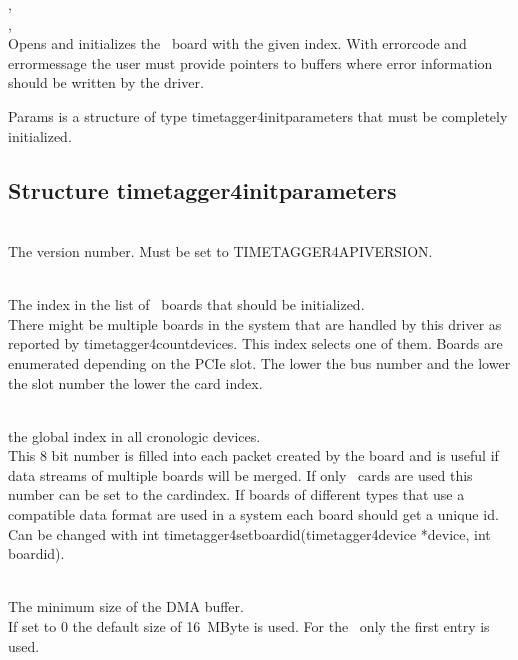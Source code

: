 		, \\ , \\
		Opens and initializes the \deviceName\ board with the given index. 
		With \textsf{error\tu code} and \textsf{error\tu message} the user must provide pointers to buffers where error information should be written by the driver.\par

		Params is a structure of type \textsf{timetagger4\tu init\tu parameters} that must be completely initialized.\par

		\subsection{Structure timetagger4\tu init\tu parameters}
			\\
			The version number. Must be set to \textsf{TIMETAGGER4\tu API\tu VERSION}.\par

			\\
			The index in the list of \deviceName\ boards that should be initialized.\\
			There might be multiple boards in the system that are handled by this driver as reported by \textsf{timetagger4\tu count\tu devices}. This index selects one of them. Boards are enumerated depending on the PCIe slot. 
			The lower the bus number and the lower the slot number the lower the card index.\par

			\\
			the global index in all cronologic devices.\\
			This 8 bit number is filled into each packet created by the board and is useful if data streams of multiple boards will be merged. If only \deviceName\ cards are used this number can be set to the \textsf{card\tu index}. If boards of different types that use a compatible data format are used in a system each board should get a unique id.
			Can be changed with \textsf{int timetagger4\tu set\tu board\tu id\allowbreak(timetagger4\tu device *device, int board\tu id)}.\par

			\\
			The minimum size of the DMA buffer.\\
			If set to 0 the default size of 16~MByte is used. For the \deviceName\ only the first entry is used.\par

